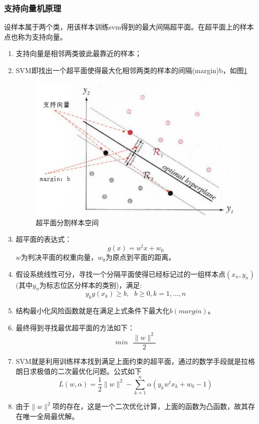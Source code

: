 \documentclass[UTF8, twocolumn ]{ctexart}
\begin{document}
\subsubsection{支持向量机原理}
设样本属于两个类，用该样本训练svm得到的最大间隔超平面。在超平面上的样本点也称为支持向量。
\begin{enumerate}
\item 支持向量是相邻两类彼此最靠近的样本；
\item SVM即找出一个超平面使得最大化相邻两类的样本的间隔(margin)b，如图\ref{fig:no7}
  \begin{figure}[!ht]\centering
    \includegraphics[keepaspectratio, scale=0.5]{no7.png}
    \caption{超平面分割样本空间\label{fig:no7}} 
  \end{figure}
\item 超平面的表达式：
  \begin{equation}
    g(x)=w^{t}x+w_{0}
  \end{equation}
  $w$为判决平面的权重向量，$w_{0}$为原点到平面的距离。
\item 假设系统线性可分，寻找一个分隔平面使得已经标记过的一组样本点$(x_{n},y_{n})$(其中$y_{n}$为标志位区分样本的类别)，满足:
  \begin{equation}
    y_{k}g(x_{k})\geqslant b, \ \ \ b\geqslant0,k=1,...,n
  \end{equation}
\item 结构最小化风险函数就是在满足上式条件下最大化$b(margin)$。
\item 最终得到寻找最优超平面的方法如下：
  \begin{equation}
    min \ \ \ \frac{\|w\|^{2}}{2}
  \end{equation}
\item SVM就是利用训练样本找到满足上面约束的超平面，通过的数学手段就是拉格朗日求极值的二次最优化问题。公式如下
  \begin{equation}
    L(w,\alpha)=\frac{1}{2}\|w\|^{2}-\sum_{k=1}^{n}\alpha(y_{k}w^{t}x_{k}+w_{0}-1)
  \end{equation}
\item 由于$\|w\|^{2}$项的存在，这是一个二次优化计算，上面的函数为凸函数，故其存在唯一全局最优解。
\end{enumerate}
\end{document}
